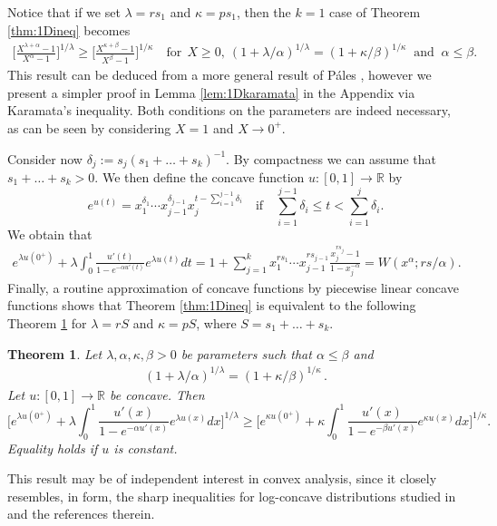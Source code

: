 \documentclass[a4paper,reqno,12pt]{amsart}
\newtheorem{theorem}{Theorem}
\renewcommand{\r}{\mathbb{R}}
\newcommand{\la}{\lambda}
\newcommand{\al}{\alpha}
\newcommand{\be}{\beta}
\newcommand{\ka}{\kappa}
\newcommand{\1}{\bo{1}}
\newcommand{\del}{\delta}
\begin{document}
Notice that if we set $\la=r s_1$ and $\ka=p s_1$, then the $k=1$ case of Theorem \ref{thm:1Dineq} becomes
\begin{align*}
\bigg[\frac{X^{\la+\al}-1}{X^{\al}-1}\bigg]^{1/\la} \geq \bigg[\frac{X^{\ka+\be}-1}{X^{\be}-1}\bigg]^{1/\ka} \quad \text{for} \ \ X\geq 0, \ (1+\la/\al)^{1/\la} = (1+\ka/\be)^{1/\ka} \ \text{ and } \ \al\leq \be.
\end{align*}
This result can be deduced from a more general result of P\'ales \cite[Thm. 1]{Pal}, however we present a simpler proof in Lemma \ref{lem:1Dkaramata} in the Appendix via Karamata's inequality. Both conditions on the parameters are indeed necessary, as can be seen by considering $X=1$ and $X\to 0^+$.

Consider now $\del_j:=s_j(s_1+\dots+s_k)^{-1}$. By compactness we can assume that $s_1+\dots+s_k>0$. We then define the concave function $u:[0,1]\to \r$ by
$$
e^{u(t)}=x_1^{\del_1}\cdots x_{j-1}^{\del_{j-1}}x_j^{t-\sum_{i=1}^{j-1}\del_i} \quad \text{if} \quad \sum_{i=1}^{j-1}\del_i\leq t< \sum_{i=1}^{j}\del_i.
$$
We obtain that
\begin{align*}
e^{\la u(0^+)}+\la \int_0^1 \frac{u'(t)}{1-e^{-\al u'(t)}}e^{\la u(t)} dt  = 1 + \sum_{j=1}^k x_1^{r s_1}\cdots x_{j-1}^{r s_{j-1}} \frac{x_j^{r s_j}-1}{1-x_j^{-\al}} = W(x^{\alpha};rs/\alpha) .
\end{align*}
Finally, a routine approximation of concave functions by piecewise linear concave functions shows that Theorem \ref{thm:1Dineq} is equivalent to the following Theorem \ref{thm:continuous1Dineq}  for $\la=rS$ and $\ka=pS$, where $S=s_1+\dots+s_k$.

\begin{theorem}\label{thm:continuous1Dineq}
Let $\la,\al,\ka,\be>0$ be parameters such that $ \al \leq \be$ and
\begin{align}\label{id:continuouscondat1}
(1+\la/\al)^{1/\la} = (1+\ka/\be)^{1/\ka}\,.
\end{align}
Let $u:[0,1]\to \r$ be concave.  Then
$$
\bigg[e^{\la u(0^+)}+\la \int_0^1 \frac{u'(x)}{1-e^{-\al u'(x)}}e^{\la u(x)} dx\bigg]^{1/\la} \geq \bigg[e^{\ka u(0^+)}+\ka \int_0^1 \frac{u'(x)}{1-e^{-\be u'(x)}}e^{\ka u(x)} dx\bigg]^{1/\ka}.
$$
Equality holds if $u$ is constant. 
\end{theorem}

This result may be of independent interest in convex analysis, since it closely resembles, in form, the sharp inequalities for log-concave distributions studied in~\cite{FG,MNR,MNT} and the references therein.
\end{document}

